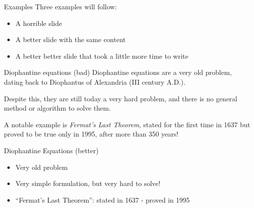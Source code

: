\documentclass[11pt]{beamer}
\begin{document}
\begin{frame}{Examples}
  Three examples will follow:
  \begin{itemize}
    \item A horrible slide
    \item A better slide with the same content
    \item A better better slide that took a little more time to write
  \end{itemize}
\end{frame}

\begin{frame}{Diophantine equations (bad)}
  Diophantine equations are a very old problem, dating back to Diophantus of
  Alexandria (III century A.D.).

  Despite this, they are still today a very hard problem, and there is
  no general method or algorithm to solve them.

  A notable example is \emph{Fermat's Last Theorem}, stated for the first time
  in 1637 but proved to be true only in 1995, after more than 350 years!
\end{frame}


\begin{frame}{Diophantine Equations (better)}
  \begin{itemize}
    \item Very old problem
    
    \vspace{0.3cm}
    \item Very simple formulation, but very hard to solve!
    
    \vspace{0.3cm}
    \item ``Fermat's Last Theorem'': stated in 1637 - proved in 1995
  \end{itemize}
\end{frame}
\end{document}
